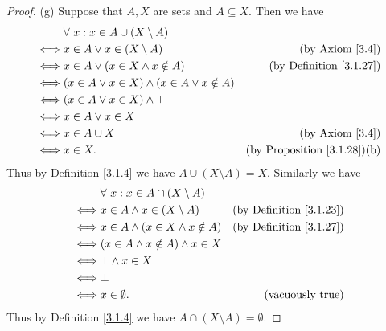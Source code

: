 \begin{proof}{(g)}
Suppose that \(A, X\) are sets and \(A \subseteq X\).
Then we have
\begin{align*}
& \forall\ x : x \in A \cup (X \setminus A) \\
\iff & x \in A \lor x \in (X \setminus A) & \text{(by Axiom \ref{3.4})} \\
\iff & x \in A \lor (x \in X \land x \notin A) & \text{(by Definition \ref{3.1.27})} \\
\iff & (x \in A \lor x \in X) \land (x \in A \lor x \notin A) \\
\iff & (x \in A \lor x \in X) \land \top \\
\iff & x \in A \lor x \in X \\
\iff & x \in A \cup X & \text{(by Axiom \ref{3.4})} \\
\iff & x \in X. & \text{(by Proposition \ref{3.1.28})(b)}
\end{align*}
Thus by Definition \ref{3.1.4} we have \(A \cup (X \setminus A) = X\).
Similarly we have
\begin{align*}
& \forall\ x : x \in A \cap (X \setminus A) \\
\iff & x \in A \land x \in (X \setminus A) & \text{(by Definition \ref{3.1.23})} \\
\iff & x \in A \land (x \in X \land x \notin A) & \text{(by Definition \ref{3.1.27})} \\
\iff & (x \in A \land x \notin A) \land x \in X \\
\iff & \bot \land x \in X \\
\iff & \bot \\
\iff & x \in \emptyset. & \text{(vacuously true)}
\end{align*}
Thus by Definition \ref{3.1.4} we have \(A \cap (X \setminus A) = \emptyset\).
\end{proof}

